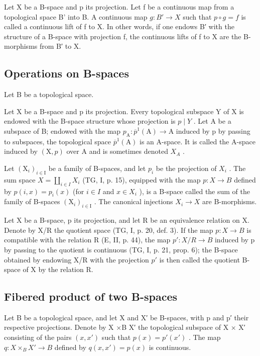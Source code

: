Let X be a B-space and p its projection. Let f be a continuous map from a topological space B' into B. A continuous map \(g: B' \to X\) such that \(p \circ g = f\) is called a continuous lift of f to X. In other words, if one endows B′ with the structure of a B-space with projection f, the continuous lifts of f to X are the B-morphisms from B′ to X.

\subsection{Operations on B-spaces}

Let B be a topological space.

Let X be a B-space and p its projection. Every topological subspace Y of X is endowed with the B-space structure whose projection is \(p \mid Y\) . Let A be a subspace of B; endowed with the map \(p_{\mathrm{A}}: \overline{p}^{1}(\mathrm{A}) \to \mathrm{A}\) induced by p by passing to subspaces, the topological space \(\overline{p}^{1}(\mathrm{A})\) is an A-space. It is called the A-space induced by \((\mathrm{X}, p)\) over A and is sometimes denoted \(X_{A}\) .

Let \((\mathrm{X}_{i})_{i\in\mathrm{I}}\) be a family of B-spaces, and let \(p_{i}\) be the projection of \(X_{i}\) . The sum space \(X = \coprod_{i\in I} X_{i}\) (TG, I, p. 15), equipped with the map \(p: X \to B\) defined by \(p(i,x) = p_{i}(x)\) (for \(i \in I\) and \(x \in X_{i}\) ), is a B-space called the sum of the family of B-spaces \((\mathrm{X}_{i})_{i\in\mathrm{I}}\) . The canonical injections \(X_{i} \to X\) are B-morphisms.

Let X be a B-space, p its projection, and let R be an equivalence relation on X. Denote by X/R the quotient space (TG, I, p. 20, def. 3). If the map \(p: X \rightarrow B\) is compatible with the relation R (E, II, p. 44), the map \(p'\colon X/R \to B\) induced by p by passing to the quotient is continuous (TG, I, p. 21, prop. 6); the B-space obtained by endowing X/R with the projection \(p'\) is then called the quotient B-space of X by the relation R.

\subsection{Fibered product of two B-spaces}

Let B be a topological space, and let X and X′ be B-spaces, with p and p′ their respective projections. Denote by X ×B X′ the topological subspace of X × X′ consisting of the pairs \((x, x')\) such that \(p(x) = p'(x')\) . The map \(q: X \times_{B} X' \to B\) defined by \(q(x, x') = p(x)\) is continuous.

